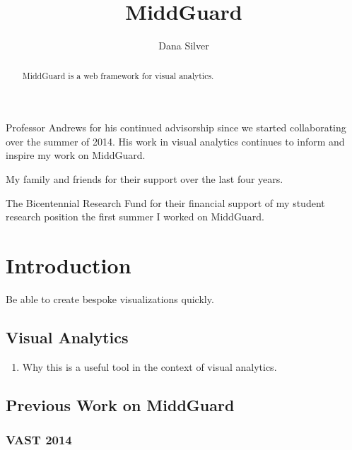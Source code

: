 \documentclass[midd]{thesis}
\title {MiddGuard}
\author {Dana Silver}
\begin{document}
\maketitle

\begin{abstract}

MiddGuard is a web framework for visual analytics.

\end{abstract}

\begin{acknowledgements}

Professor Andrews for his continued advisorship since we started collaborating
over the summer of 2014. His work in visual analytics continues to inform and
inspire my work on MiddGuard.

My family and friends for their support over the last four years.

The Bicentennial Research Fund for their financial support of my student
research position the first summer I worked on MiddGuard.

\end{acknowledgements}

\contentspage
\tablelistpage
\figurelistpage

\normalspacing \setcounter{page}{1} 

\chapter{Introduction}

Be able to create bespoke visualizations quickly.

\section{Visual Analytics}
\begin{enumerate}
  \item Why this is a useful tool in the context of visual analytics.
\end{enumerate}

\section{Previous Work on MiddGuard}

\subsection{VAST 2014}
\end{document}
